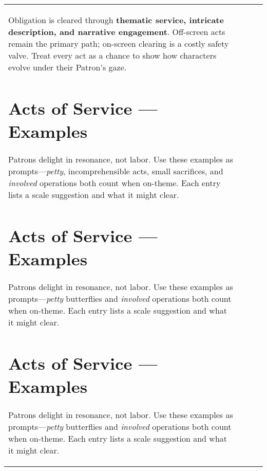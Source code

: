 \begin{longtable}{@{}p{3.3cm}p{3.3cm}p{4.6cm}p{7.2cm}@{}}
\begin{tcolorbox}[title={Summary},colback=gray!5,colframe=black]
Obligation is cleared through \textbf{thematic service, intricate description, and narrative engagement}. Off-screen acts remain the primary path; on-screen clearing is a costly safety valve. Treat every act as a chance to show how characters evolve under their Patron’s gaze.\end{tcolorbox}


\section{Acts of Service — Examples}\label{sec:acts-of-service-table}
\index{Acts of Service}\index{Obligation}\index{Patrons}

Patrons delight in resonance, not labor. Use these examples as prompts—\emph{petty}, incomprehensible acts, small sacrifices,  and \emph{involved} operations both count when on-theme. Each entry lists a scale suggestion and what it might clear.


\section{Acts of Service — Examples}\label{sec:acts-of-service-table}
\index{Acts of Service}\index{Obligation}\index{Patrons}

Patrons delight in resonance, not labor. Use these examples as prompts—\emph{petty} butterflies and \emph{involved} operations both count when on-theme. Each entry lists a scale suggestion and what it might clear.


\section{Acts of Service — Examples}\label{sec:acts-of-service-table}
\index{Acts of Service}\index{Obligation}\index{Patrons}

Patrons delight in resonance, not labor. Use these examples as prompts---\emph{petty} butterflies and \emph{involved} operations both count when on-theme. Each entry lists a scale suggestion and what it might clear.


\end{longtable}
